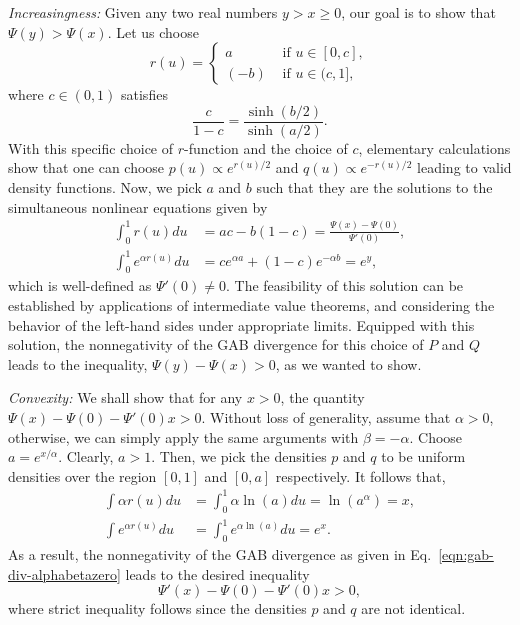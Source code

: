 \documentclass[11pt]{article}
\theoremstyle{plain}
\theoremstyle{remark}
\begin{document}
\noindent\emph{Increasingness:} Given any two real numbers $y > x \geq 0$, our goal is to show that $\Psi(y) > \Psi(x)$. Let us choose
\begin{equation*}
    r(u) = \begin{cases}
        a    & \text{ if } u \in [0, c], \\
        (-b) & \text{ if } u \in (c, 1],
    \end{cases}
\end{equation*}
\noindent where $c \in (0, 1)$ satisfies
\begin{equation*}
    \frac{c}{1-c} = \frac{\sinh(b/2)}{\sinh(a/2)}.
\end{equation*}
\noindent With this specific choice of $r$-function and the choice of $c$, elementary calculations show that one can choose $p(u) \propto e^{r(u)/2}$ and $q(u) \propto e^{-r(u)/2}$ leading to valid density functions. Now, we pick $a$ and $b$ such that they are the solutions to the simultaneous nonlinear equations given by
\begin{align*}
    \int_0^1 r(u)du            & = ac - b(1-c) = \frac{\Psi(x) - \Psi(0)}{\Psi'(0)}, \\
    \int_0^1 e^{\alpha r(u)}du & = ce^{\alpha a} + (1-c) e^{-\alpha b} = e^{y},
\end{align*}
\noindent which is well-defined as $\Psi'(0) \neq 0$. The feasibility of this solution can be established by applications of intermediate value theorems, and considering the behavior of the left-hand sides under appropriate limits. Equipped with this solution, the nonnegativity of the GAB divergence for this choice of $P$ and $Q$ leads to the inequality, $\Psi(y) - \Psi(x) > 0$, as we wanted to show.

\emph{Convexity:} We shall show that for any $x > 0$, the quantity $\Psi(x) - \Psi(0) - \Psi'(0)x > 0$. Without loss of generality, assume that $\alpha > 0$, otherwise, we can simply apply the same arguments with $\beta = -\alpha$. Choose $a = e^{x/\alpha}$. Clearly, $a > 1$. Then, we pick the densities $p$ and $q$ to be uniform densities over the region $[0, 1]$ and $[0, a]$ respectively. It follows that,
\begin{align*}
    \int \alpha r(u)du     & = \int_0^1 \alpha\ln(a)du = \ln(a^\alpha) = x, \\
    \int e^{\alpha r(u)}du & = \int_0^1 e^{\alpha \ln(a)}du = e^x.
\end{align*}
\noindent As a result, the nonnegativity of the GAB divergence as given in Eq.~\eqref{eqn:gab-div-alphabetazero} leads to the desired inequality
\begin{equation*}
    \Psi'(x) - \Psi(0) - \Psi'(0) x > 0,
\end{equation*}
\noindent where strict inequality follows since the densities $p$ and $q$ are not identical.
\end{document}
